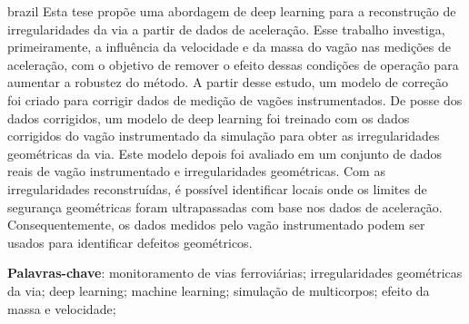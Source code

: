 \setlength{\absparsep}{18pt} %
\begin{resumo}[Resumo]
 \begin{otherlanguage*}{brazil}
    Esta tese propõe uma abordagem de deep learning para a reconstrução de irregularidades da via a partir de dados de aceleração. Esse trabalho investiga, primeiramente, a influência da velocidade e da massa do vagão nas medições de aceleração, com o objetivo de remover o efeito dessas condições de operação para aumentar a robustez do método. A partir desse estudo, um modelo de correção foi criado para corrigir dados de medição de vagões instrumentados. De posse dos dados corrigidos, um modelo de deep learning foi treinado com os dados corrigidos do vagão instrumentado da simulação para obter as irregularidades geométricas da via. Este modelo depois foi avaliado em um conjunto de dados reais de vagão instrumentado e irregularidades geométricas. Com as irregularidades reconstruídas, é possível identificar locais onde os limites de segurança geométricas foram ultrapassadas com base nos dados de aceleração. Consequentemente, os dados medidos pelo vagão instrumentado podem ser usados para identificar defeitos geométricos.

    \textbf{Palavras-chave}: monitoramento de vias ferroviárias; irregularidades geométricas da via; deep learning; machine learning; simulação de multicorpos; efeito da massa e velocidade;
 \end{otherlanguage*}
\end{resumo}
